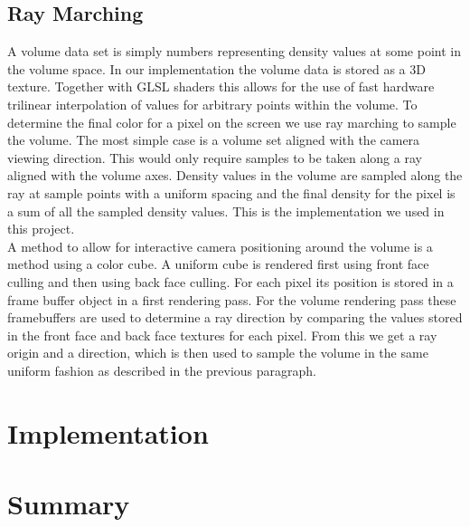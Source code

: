 \documentclass[11pt,twocolumn]{article}
\begin{document}
\subsection{Ray Marching}
A volume data set is simply numbers representing density values at some point in the volume space.
In our implementation the volume data is stored as a 3D texture.
Together with GLSL shaders this allows for the use of fast hardware trilinear interpolation of values for arbitrary points within the volume. To determine the final color for a pixel on the screen we use ray marching to sample the volume.
The most simple case is a volume set aligned with the camera viewing direction.
This would only require samples to be taken along a ray aligned with the volume axes.
Density values in the volume are sampled along the ray at sample points with a uniform spacing and the final density for the pixel is a sum of all the sampled density values.
This is the implementation we used in this project.
\\
A method to allow for interactive camera positioning around the volume is a method using a color cube.
A uniform cube is rendered first using front face culling and then using back face culling.
For each pixel its position is stored in a frame buffer object in a first rendering pass.
For the volume rendering pass these framebuffers are used to determine a ray direction by comparing the values stored in the front face and back face textures for each pixel. From this we get a ray origin and a direction, which is then used to sample the volume in the same uniform fashion as described in the previous paragraph.

\section{Implementation}

\section{Summary}


\endgroup
\newpage

\nocite{*}

\end{document}
